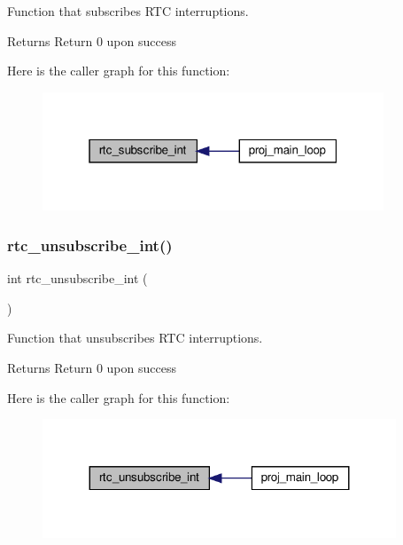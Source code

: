 Function that subscribes R\+TC interruptions. 

\begin{DoxyReturn}{Returns}
Return 0 upon success 
\end{DoxyReturn}
Here is the caller graph for this function\+:\nopagebreak
\begin{figure}[H]
\begin{center}
\leavevmode
\includegraphics[width=289pt]{group__rtc_gabd8de825e876e8ef94c64ac616f68a11_icgraph}
\end{center}
\end{figure}
\mbox{\label{group__rtc_gab8f17bf5280c908c8b199a90fefcc758}} 
\subsubsection{\texorpdfstring{rtc\+\_\+unsubscribe\+\_\+int()}{rtc\_unsubscribe\_int()}}
{\footnotesize\ttfamily int rtc\+\_\+unsubscribe\+\_\+int (\begin{DoxyParamCaption}{ }\end{DoxyParamCaption})}



Function that unsubscribes R\+TC interruptions. 

\begin{DoxyReturn}{Returns}
Return 0 upon success 
\end{DoxyReturn}
Here is the caller graph for this function\+:\nopagebreak
\begin{figure}[H]
\begin{center}
\leavevmode
\includegraphics[width=299pt]{group__rtc_gab8f17bf5280c908c8b199a90fefcc758_icgraph}
\end{center}
\end{figure}
\mbox{\label{group__rtc_gade198e3189c6f8195cde4e404671f980}} 

